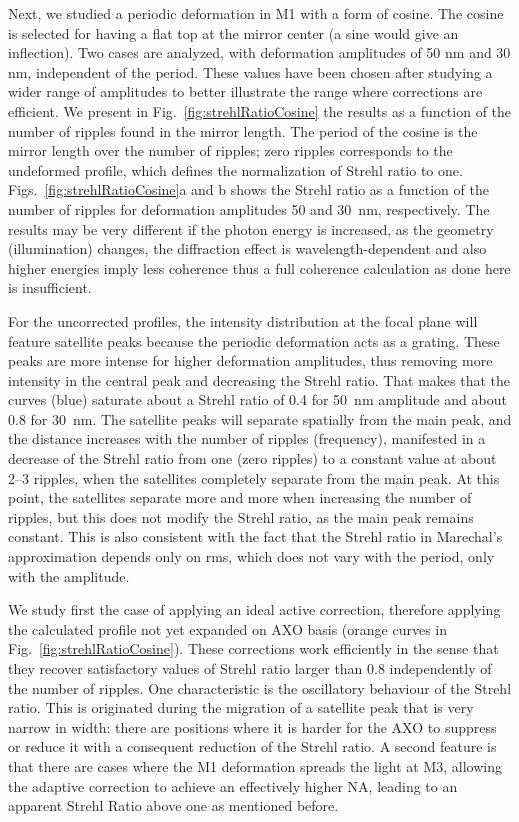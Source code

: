 \documentclass{iucr}
\begin{document}
Next, we studied a periodic deformation in M1 with a form of cosine. The cosine is selected for having a flat top at the mirror center (a sine would give an inflection). Two cases are analyzed, with deformation amplitudes of 50 nm and 30 nm, independent of the period. These values have been chosen after studying a wider range of amplitudes to better illustrate the range where corrections are efficient. We present in Fig.~\ref{fig:strehlRatioCosine} the results as a function of the number of ripples found in the mirror length. The period of the cosine is the mirror length over the number of ripples; zero ripples corresponds to the undeformed profile, which defines the normalization of Strehl ratio to one. Figs.~\ref{fig:strehlRatioCosine}a and b shows the Strehl ratio as a function of the number of ripples for deformation amplitudes 50 and 30~nm, respectively. The results may be very different if the photon energy is increased, as the geometry (illumination) changes, the diffraction effect is wavelength-dependent and also higher energies imply less coherence thus a  full coherence calculation as done here is insufficient.

For the uncorrected profiles, the intensity distribution at the focal plane will feature satellite peaks because the periodic deformation acts as a grating. These peaks are more intense for higher deformation amplitudes, thus removing more intensity in the central peak and decreasing the Strehl ratio. That makes that the curves (blue) saturate about a Strehl ratio of 0.4 for 50~nm amplitude and about 0.8 for 30~nm. The satellite peaks will separate spatially from the main peak, and the distance increases with the number of ripples (frequency), manifested in a decrease of the Strehl ratio from one (zero ripples) to a constant value at about 2--3 ripples, when the satellites completely separate from the main peak. At this point, the satellites separate more and more when increasing the number of ripples, but this does not modify the Strehl ratio, as the main peak remains constant. This is also consistent with the fact that the Strehl ratio in Marechal's approximation depends only on rms, which does not vary with the period, only with the amplitude.

We study first the case of applying an ideal active correction, therefore applying the calculated profile not yet expanded on AXO basis (orange curves in Fig.~\ref{fig:strehlRatioCosine}). These corrections work efficiently in the sense that they recover satisfactory values of Strehl ratio larger than 0.8 independently of the number of ripples. One characteristic is the oscillatory behaviour of the Strehl ratio. This is originated during the migration of a satellite peak that is very narrow in width: there are positions where it is harder for the AXO to suppress or reduce it with a consequent reduction of the Strehl ratio. A second feature is that there are cases where the M1 deformation spreads the light at M3, allowing the adaptive correction to achieve an effectively higher NA, leading to an apparent Strehl Ratio above one as mentioned before.
\end{document}
